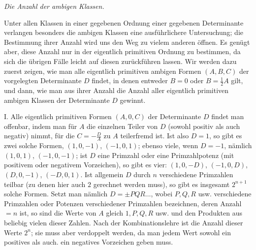 \begin{center}
\textit{Die Anzahl der ambigen Klassen.}
\end{center}

Unter allen Klassen in einer gegebenen Ordnung einer gegebenen Determinante verlangen besonders die ambigen Klassen eine ausführlichere Untersuchung; die Bestimmung ihrer Anzahl wird uns den Weg zu vielem anderen öffnen. Es genügt aber, diese Anzahl nur in der eigentlich primitiven Ordnung zu bestimmen, da sich die übrigen Fälle leicht auf diesen zurückführen lassen. Wir werden dazu zuerst zeigen, wie man alle eigentlich primitiven ambigen Formen \((A,B,C)\) der vorgelegten Determinante \(D\) findet, in denen entweder \(B=0\) oder \(B=\frac12 A\) gilt, und dann, wie man aus ihrer Anzahl die Anzahl aller eigentlich primitiven ambigen Klassen der Determinante \(D\) gewinnt.

I. Alle eigentlich primitiven Formen \((A,0,C)\) der Determinante \(D\) findet man offenbar, indem man für \(A\) die einzelnen Teiler von \(D\) (sowohl positiv als auch negativ) nimmt, für die \(C=-\frac{D}{A}\) zu \(A\) teilerfremd ist. Ist also \(D=1\), so gibt es zwei solche Formen, \((1,0,-1)\), \((-1,0,1)\); ebenso viele, wenn \(D=-1\), nämlich \((1,0,1)\), \((-1,0,-1)\); ist \(D\) eine Primzahl oder eine Primzahlpotenz (mit positivem oder negativem Vorzeichen), so gibt es vier: \((1,0,-D)\), \((-1,0,D)\), \((D,0,-1)\), \((-D,0,1)\). Ist allgemein \(D\) durch \(n\) verschiedene Primzahlen teilbar (zu denen hier auch \(2\) gerechnet werden muss), so gibt es insgesamt \(2^{n+1}\) solche Formen. Setzt man nämlich \(D=\pm PQR\ldots\), wobei \(P,Q,R\) usw. verschiedene Primzahlen oder Potenzen verschiedener Primzahlen bezeichnen, deren Anzahl \(=n\) ist, so sind die Werte von \(A\) gleich \(1,P,Q,R\) usw. und den Produkten aus beliebig vielen dieser Zahlen. Nach der Kombinationslehre ist die Anzahl dieser Werte \(2^n\); sie muss aber verdoppelt werden, da man jedem Wert sowohl ein positives als auch. ein negatives Vorzeichen geben muss.

